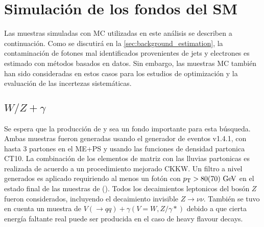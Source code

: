 \section{Simulación de los fondos del SM}
\label{sec:bkg_samples}

\newcommand{\mccaption}{Se detallan la sección eficaz a LO para cada modo de decaimiento,
  los factores $k$ (para la normalización NLO) y las eficiencias del filtro
  , así como también la luminosidad integrada correspondiente
  a la estadística total de cada muestra.}

Las muestras simuladas con MC utilizadas en este análisis se describen
a continuación. Como se discutirá en la \cref{sec:background_estimation},
la contaminación de fotones mal identificados provenientes de jets y electrones
es estimado con métodos basados en datos. Sin embargo, las muestras MC también
han sido consideradas en estos casos para los estudios de optimización y la
evaluación de las incertezas sistemáticas.

\subsection{$W/Z + \gamma$}

Se espera que la producción de {\wgam} y {\zgam} sea un fondo importante
para esta búsqueda. Ambas muestras fueron generadas usando el generador
de eventos {\sherpa} v1.4.1\cite{SherpaGen}, con hasta 3 partones en el
ME+PS y usando las funciones de densidad partonica CT10.
La combinación de los elementos de matriz con las lluvias partonicas
es realizada de acuerdo a un procedimiento mejorado CKKW\cite{Catani:2001cc,Krauss:2002up}.
Un filtro a nivel generados es aplicado requiriendo al menos un fotón
con $\pt > 80(70) \gev$ en el estado final de las muestras de {\wgam} (\zgam).
Todos los decaimientos leptonicos del bosón $Z$ fueron considerados,
incluyendo el decaimiento invisible $Z\to\nu\nu$.
También se tuvo en cuenta un muestra de $V(\to qq)+\gamma  (V=W,Z/\gamma*)$
debido a que cierta energía faltante real puede  ser producida en el caso
de heavy flavour decays.


